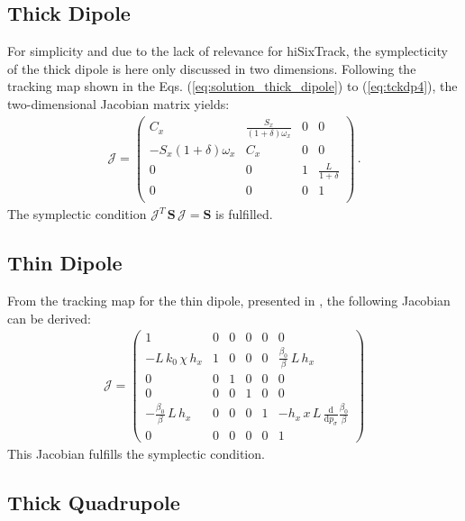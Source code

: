 \begin{appendices}
\subsection{Thick Dipole}
For simplicity and due to the lack of relevance for hiSixTrack, the symplecticity of the thick dipole is here only discussed in two dimensions. Following the tracking map shown in the Eqs. (\ref{eq:solution_thick_dipole}) to (\ref{eq:tckdp4}), the two-dimensional Jacobian matrix yields: 
\begin{align}
\mathcal{J} = 
\left(
\begin{array}{cccc}
 C_x & \frac{S_x}{(1+\delta) \omega_x } & 0 & 0 \\
 -S_x (1+\delta) \omega_x  & C_x & 0 & 0 \\
 0 & 0 & 1 & \frac{L}{1+\delta} \\
 0 & 0 & 0 & 1 \\
\end{array}
\right) \, .
\end{align}
%
The symplectic condition $\mathcal{J}^T \, \mathbf{S} \, \mathcal{J} = \mathbf{S}$ is fulfilled.


\subsection{Thin Dipole}

From the tracking map for the thin dipole, presented in , the following Jacobian can be derived:
\begin{align}
  \mathcal{J} = 
\begin{pmatrix} 1 & 0 & 0 & 0 & 0 & 0 \\ -L \, k_0 \, \chi \, h_x & 1 & 0 & 0 & 0 & \frac{\beta_0}{\beta} \, L \, h_x \\ 0 & 0 & 1 & 0 & 0 & 0 \\ 0 & 0 & 0 & 1 & 0 & 0 \\ -\frac{\beta_0}{\beta} \,  L \, h_x & 0 & 0 & 0 & 1 & -h_x \, x \, L \, \frac{\mathrm{d}}{\mathrm{d} p_\sigma} \frac{\beta_0}{\beta} \\ 0 & 0 & 0 & 0 & 0 & 1   \end{pmatrix}
\end{align}
This Jacobian fulfills the symplectic condition.

\subsection{Thick Quadrupole}


\end{appendices}
